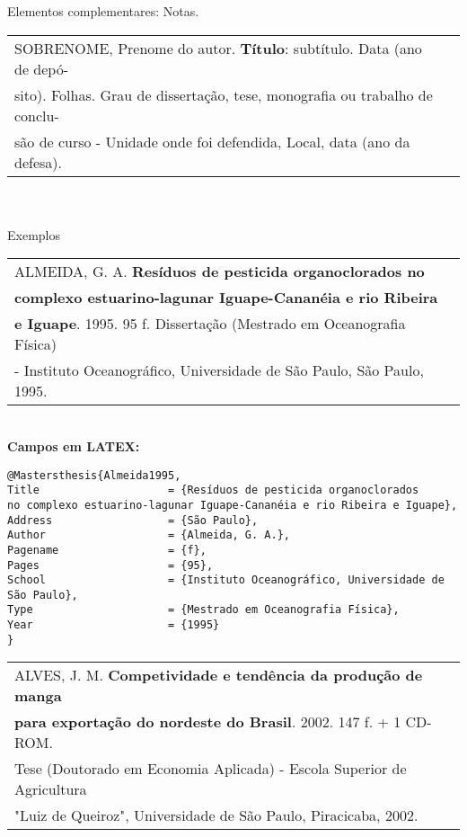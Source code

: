 Elementos complementares: Notas. \\

\begin{tabular}{|l|c|} \hline
SOBRENOME, Prenome do autor. \textbf{Título}: subtítulo. Data (ano de
depó-\\sito). Folhas. Grau de dissertação, tese, monografia ou
trabalho de conclu-\\são de curso - Unidade onde foi defendida,
Local, data (ano da defesa).\\\hline
\end{tabular}\\
\\

Exemplos \\

\begin{tabular}{|l|c|} \hline
ALMEIDA, G. A. \textbf{Resíduos de pesticida organoclorados no} \\ \textbf{complexo estuarino-lagunar Iguape-Cananéia e rio Ribeira}\\ \textbf{e Iguape}. 1995. 95 f.
Dissertação (Mestrado em Oceanografia Física)\\ - Instituto
Oceanográfico, Universidade de São Paulo, São Paulo, 1995.   \\\hline
\end{tabular} \\

\textbf{Campos em LATEX:}

\begingroup
\fontsize{10pt}{12pt}\selectfont
\begin{verbatim}
@Mastersthesis{Almeida1995,
Title                    = {Resíduos de pesticida organoclorados 
no complexo estuarino-lagunar Iguape-Cananéia e rio Ribeira e Iguape},
Address                  = {São Paulo},
Author                   = {Almeida, G. A.},
Pagename                 = {f},
Pages                    = {95},
School                   = {Instituto Oceanográfico, Universidade de 
São Paulo},
Type                     = {Mestrado em Oceanografia Física},
Year                     = {1995}
}
\end{verbatim}
\endgroup
	
\begin{tabular}{|l|c|} \hline
	ALVES, J. M. \textbf{Competividade e tendência da produção de manga} \\ \textbf{para exportação do nordeste do Brasil}. 2002. 147 f. + 1 CD-ROM.\\ Tese (Doutorado em Economia Aplicada) - Escola Superior de Agricultura \\ "Luiz de Queiroz", Universidade de São Paulo, Piracicaba, 2002.    \\\hline
\end{tabular} \\
	
